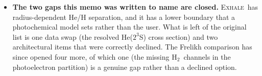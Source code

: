 \documentclass[english,a4paper]{my_memo}
\newcommand{\EXHALE}{\textsc{Exhale}}
\newcommand{\Htwo}{\ensuremath{\mathrm{H}_2}}
\begin{document}
\begin{itemize}[nosep]
    (Section~\ref{sec:detbal}); \EXHALE\ now builds the dissociation from the
    recombination through the equilibrium constant and is exact
    (Section~\ref{sec:detbalfix}), and the finding stands for Frelikh only.
    The extrapolated-velocity inner boundary
    both codes use stops being a boundary condition if the inflow ever goes
    supersonic, a weakness only \EXHALE\ has so far found in itself, belongs
    to both.
  \item \textbf{The two gaps this memo was written to name are closed.}
    \EXHALE\ has radius-dependent He/H separation, and it has a lower boundary
    that a photochemical model sets rather than the user. What is left of the
    original list is one data swap (the resolved He($2^3$S) cross section) and
    two architectural items that were correctly declined. The Frelikh
    comparison has since opened four more, of which one (the missing \Htwo\
    channels in the photoelectron partition) is a genuine gap rather than a
    declined option.
\end{itemize}
\end{document}
